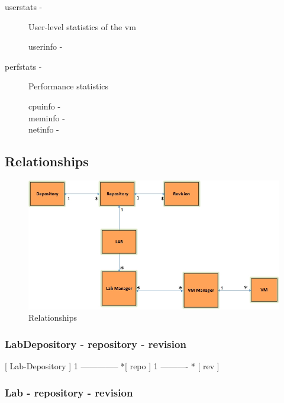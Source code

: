 \documentclass[11pt]{article}
\begin{document}
\begin{description}
\begin{description}
\begin{description}
\item [userstats -] User-level statistics of the vm

\begin{description}
\item [userinfo -]
\end{description}

\item [perfstats -] Performance statistics

\begin{description}
\item [cpuinfo -]
\item [meminfo -]
\item [netinfo -]
\end{description}

\end{description}

\end{description}

\end{description}
\subsection{Relationships}
\label{sec-3.3}


\begin{figure}[htb]
\centering
\includegraphics[width=12cm]{relationships.jpg}
\caption{Relationships}
\end{figure}

\subsubsection{LabDepository - repository - revision}
\label{sec-3.3.1}


 [ Lab-Depository ] 1 -------------- *[ repo ] 1 ---------- * [ rev ]

\subsubsection{Lab - repository - revision}
\label{sec-3.3.2}
\end{document}
